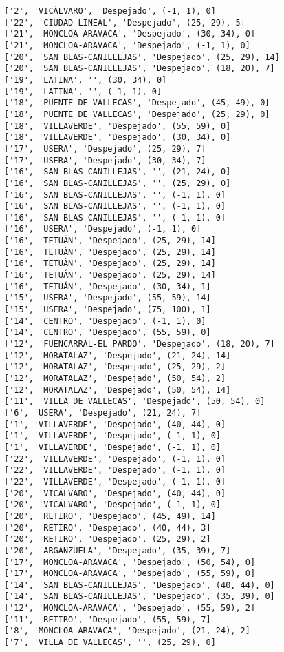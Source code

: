 \documentclass[11pt]{article}
\begin{document}
\begin{Verbatim}[commandchars=\\\{\}]
['2', 'VICÁLVARO', 'Despejado', (-1, 1), 0]
['22', 'CIUDAD LINEAL', 'Despejado', (25, 29), 5]
['21', 'MONCLOA-ARAVACA', 'Despejado', (30, 34), 0]
['21', 'MONCLOA-ARAVACA', 'Despejado', (-1, 1), 0]
['20', 'SAN BLAS-CANILLEJAS', 'Despejado', (25, 29), 14]
['20', 'SAN BLAS-CANILLEJAS', 'Despejado', (18, 20), 7]
['19', 'LATINA', '', (30, 34), 0]
['19', 'LATINA', '', (-1, 1), 0]
['18', 'PUENTE DE VALLECAS', 'Despejado', (45, 49), 0]
['18', 'PUENTE DE VALLECAS', 'Despejado', (25, 29), 0]
['18', 'VILLAVERDE', 'Despejado', (55, 59), 0]
['18', 'VILLAVERDE', 'Despejado', (30, 34), 0]
['17', 'USERA', 'Despejado', (25, 29), 7]
['17', 'USERA', 'Despejado', (30, 34), 7]
['16', 'SAN BLAS-CANILLEJAS', '', (21, 24), 0]
['16', 'SAN BLAS-CANILLEJAS', '', (25, 29), 0]
['16', 'SAN BLAS-CANILLEJAS', '', (-1, 1), 0]
['16', 'SAN BLAS-CANILLEJAS', '', (-1, 1), 0]
['16', 'SAN BLAS-CANILLEJAS', '', (-1, 1), 0]
['16', 'USERA', 'Despejado', (-1, 1), 0]
['16', 'TETUÁN', 'Despejado', (25, 29), 14]
['16', 'TETUÁN', 'Despejado', (25, 29), 14]
['16', 'TETUÁN', 'Despejado', (25, 29), 14]
['16', 'TETUÁN', 'Despejado', (25, 29), 14]
['16', 'TETUÁN', 'Despejado', (30, 34), 1]
['15', 'USERA', 'Despejado', (55, 59), 14]
['15', 'USERA', 'Despejado', (75, 100), 1]
['14', 'CENTRO', 'Despejado', (-1, 1), 0]
['14', 'CENTRO', 'Despejado', (55, 59), 0]
['12', 'FUENCARRAL-EL PARDO', 'Despejado', (18, 20), 7]
['12', 'MORATALAZ', 'Despejado', (21, 24), 14]
['12', 'MORATALAZ', 'Despejado', (25, 29), 2]
['12', 'MORATALAZ', 'Despejado', (50, 54), 2]
['12', 'MORATALAZ', 'Despejado', (50, 54), 14]
['11', 'VILLA DE VALLECAS', 'Despejado', (50, 54), 0]
['6', 'USERA', 'Despejado', (21, 24), 7]
['1', 'VILLAVERDE', 'Despejado', (40, 44), 0]
['1', 'VILLAVERDE', 'Despejado', (-1, 1), 0]
['1', 'VILLAVERDE', 'Despejado', (-1, 1), 0]
['22', 'VILLAVERDE', 'Despejado', (-1, 1), 0]
['22', 'VILLAVERDE', 'Despejado', (-1, 1), 0]
['22', 'VILLAVERDE', 'Despejado', (-1, 1), 0]
['20', 'VICÁLVARO', 'Despejado', (40, 44), 0]
['20', 'VICÁLVARO', 'Despejado', (-1, 1), 0]
['20', 'RETIRO', 'Despejado', (45, 49), 14]
['20', 'RETIRO', 'Despejado', (40, 44), 3]
['20', 'RETIRO', 'Despejado', (25, 29), 2]
['20', 'ARGANZUELA', 'Despejado', (35, 39), 7]
['17', 'MONCLOA-ARAVACA', 'Despejado', (50, 54), 0]
['17', 'MONCLOA-ARAVACA', 'Despejado', (55, 59), 0]
['14', 'SAN BLAS-CANILLEJAS', 'Despejado', (40, 44), 0]
['14', 'SAN BLAS-CANILLEJAS', 'Despejado', (35, 39), 0]
['12', 'MONCLOA-ARAVACA', 'Despejado', (55, 59), 2]
['11', 'RETIRO', 'Despejado', (55, 59), 7]
['8', 'MONCLOA-ARAVACA', 'Despejado', (21, 24), 2]
['7', 'VILLA DE VALLECAS', '', (25, 29), 0]

\end{Verbatim}
\end{document}
